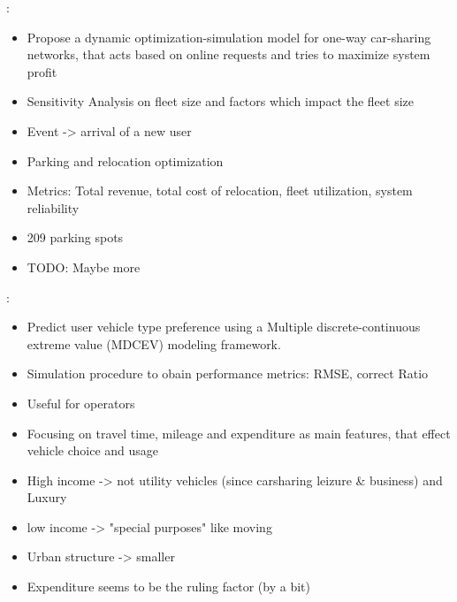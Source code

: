 \cite{Nourinejad2014}:
\begin{itemize}
    \item Propose a dynamic optimization-simulation model for one-way car-sharing networks, that acts based on
    online requests and tries to maximize system profit
    \item Sensitivity Analysis on fleet size and factors which impact the fleet size
    \item Event -> arrival of a new user
    \item Parking and relocation optimization
    \item Metrics: Total revenue, total cost of relocation, fleet utilization, system reliability
    \item 209 parking spots
    \item TODO: Maybe more
\end{itemize}

\cite{JIAN2017362}:
\begin{itemize}
    \item Predict user vehicle type preference using a Multiple discrete-continuous extreme value (MDCEV) modeling framework. 
    \item Simulation procedure to obain performance metrics: RMSE, correct Ratio
    \item Useful for operators
    \item Focusing on travel time, mileage and expenditure as main features, that effect vehicle choice and usage
    \item High income -> not utility vehicles (since carsharing leizure \& business) and Luxury
    \item low income -> "special purposes" like moving
    \item Urban structure -> smaller
    \item Expenditure seems to be the ruling factor (by a bit)
\end{itemize}


